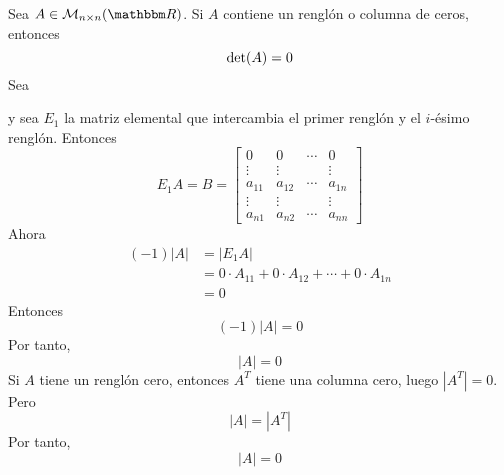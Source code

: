 \begin{proposition}
    Sea $A \in \mathcal{M}_{n \times n}(\RR)$. Si $A$ contiene un renglón o columna de ceros, entonces
    $$\operatorname{det}(A) = 0$$
    \demostracion Sea
    \begin{center}
    \end{center}
    y sea $E_1$ la matriz elemental que intercambia el primer renglón y el $i$-ésimo renglón. Entonces
    $$E_1A = B = \begin{bmatrix}
        0 & 0 & \cdots & 0 \\
        \vdots & \vdots & & \vdots \\
        a_{11} & a_{12} & \cdots & a_{1n} \\
        \vdots & \vdots & & \vdots \\
        a_{n1} & a_{n2} & \cdots & a_{nn}
    \end{bmatrix}$$
    Ahora
    \begin{align*}
        (-1)|A| & = |E_1A| \\
        & = 0 \cdot A_{11} + 0 \cdot A_{12} + \cdots + 0 \cdot A_{1n} \\
        & = 0
    \end{align*}
    Entonces
    $$(-1)|A| = 0$$
    Por tanto,
    $$|A| = 0$$
    Si $A$ tiene un renglón cero, entonces $A^T$ tiene una columna cero, luego $|A^T| = 0$. Pero
    $$|A| = |A^T|$$
    Por tanto,
    $$|A| = 0$$
\end{proposition}

